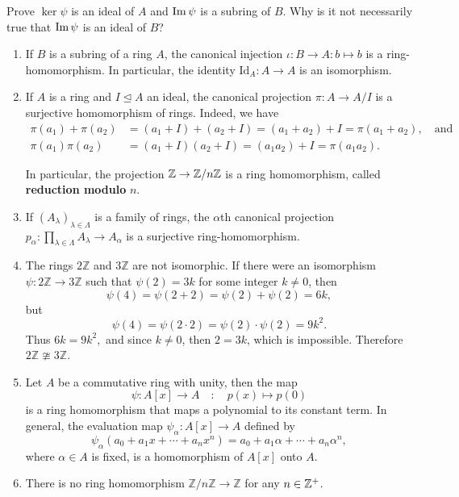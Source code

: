 \documentclass[11pt,a4paper]{article}
\begin{document}
\begin{eje}
    Prove \(\ker\psi\) is an ideal of \(A\) and \(\operatorname{Im}\psi \) is a subring of \(B\). Why is it not necessarily true that \(\operatorname{Im}\psi \) is an ideal  of \(B\)?
\end{eje}

\begin{exa}
\begin{enumerate}[label=(\roman*)]
\item If \(B\) is a subring of a ring \(A\), the canonical injection \(\iota \colon B\to A\colon b\mapsto b\) is a ring-homomorphism.
In particular, the identity \(\text{Id}_A\colon A\to A\) is an isomorphism.

\item If \(A\) is a ring and \(I\trianglelefteq A\) an ideal, the canonical projection \(\pi \colon A\to A/I\) is a surjective homomorphism of rings.
Indeed,  we have 
\begin{align*}
    \pi (a_1) + \pi (a_2) & = (a_1 + I) + (a_2 + I)
                    = (a_1 + a_2) + I
                    = \pi (a_1 + a_2), \quad\text{and}\\
    \pi (a_1) \pi (a_2)   & = (a_1 + I)(a_2 + I)
                     = (a_1 a_2) + I 
                     = \pi (a_1 a_2).
\end{align*}
    

In particular, the projection  \(\mathbb{Z}\to \mathbb{Z}/ n\mathbb{Z}\) is a ring homomorphism, called \textbf{reduction modulo} \(n\).

\item If \((A_\lambda)_{\lambda\in \Lambda}\) is a family of rings, the \(\alpha\)th canonical projection \(p_\alpha \colon \prod_{\lambda\in \Lambda} A_\lambda\to A_\alpha\) is a surjective ring-homomorphism.
\item The rings \( 2\mathbb{Z} \) and \( 3\mathbb{Z} \) are not isomorphic. If there were an isomorphism
\(
\psi: 2\mathbb{Z} \to 3\mathbb{Z}
\)
such that \( \psi(2) = 3k \) for some integer  \( k \neq 0 \), then
\[
\psi(4) = \psi(2 + 2) = \psi(2) + \psi(2) = 6k,
\]
but
\[
\psi(4) = \psi(2 \cdot 2) = \psi(2) \cdot \psi(2) = 9k^2.
\]
Thus
\(
6k = 9k^2,
\)
and since \( k \neq 0 \), then \( 2 = 3k \), which is impossible. 
Therefore \( 2\mathbb{Z} \ncong 3\mathbb{Z} \).

\item Let \( A \) be a commutative ring with unity, then the map
\[
\psi: A[x] \to A\quad: \quad p(x) \mapsto  p(0)
\]
is a ring homomorphism that maps a polynomial to its constant term.
In general, the evaluation map \(\psi_\alpha: A[x]\to A\) defined by 
\[
\psi_\alpha\left(a_0 + a_1x + \cdots + a_nx^n\right) = a_0 + a_1\alpha + \cdots + a_n\alpha^n,
\] 
where \(\alpha\in A\) is fixed,  is a homomorphism of \( A[x] \) onto \( A \). 

\item There is no ring homomorphism \( \mathbb{Z}/n\mathbb{Z} \to \mathbb{Z} \) for any \( n \in \mathbb{Z}^+ \).
\end{enumerate}
\end{exa}
\end{document}
